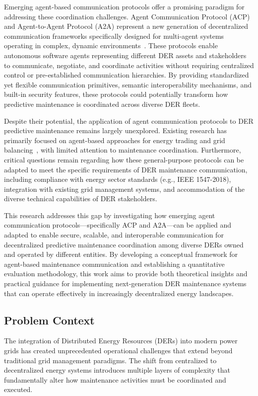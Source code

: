 \documentclass[12pt,a4paper]{article}
\begin{document}
Emerging agent-based communication protocols offer a promising paradigm for addressing these coordination challenges. Agent Communication Protocol (ACP) and Agent-to-Agent Protocol (A2A) represent a new generation of decentralized communication frameworks specifically designed for multi-agent systems operating in complex, dynamic environments~\cite{smith2023}. These protocols enable autonomous software agents representing different DER assets and stakeholders to communicate, negotiate, and coordinate activities without requiring centralized control or pre-established communication hierarchies. By providing standardized yet flexible communication primitives, semantic interoperability mechanisms, and built-in security features, these protocols could potentially transform how predictive maintenance is coordinated across diverse DER fleets.

Despite their potential, the application of agent communication protocols to DER predictive maintenance remains largely unexplored. Existing research has primarily focused on agent-based approaches for energy trading and grid balancing~\cite{ringler2016,khorasany2020}, with limited attention to maintenance coordination. Furthermore, critical questions remain regarding how these general-purpose protocols can be adapted to meet the specific requirements of DER maintenance communication, including compliance with energy sector standards (e.g., IEEE 1547-2018), integration with existing grid management systems, and accommodation of the diverse technical capabilities of DER stakeholders.

This research addresses this gap by investigating how emerging agent communication protocols---specifically ACP and A2A---can be applied and adapted to enable secure, scalable, and interoperable communication for decentralized predictive maintenance coordination among diverse DERs owned and operated by different entities. By developing a conceptual framework for agent-based maintenance communication and establishing a quantitative evaluation methodology, this work aims to provide both theoretical insights and practical guidance for implementing next-generation DER maintenance systems that can operate effectively in increasingly decentralized energy landscapes.

\subsection{Problem Context}

The integration of Distributed Energy Resources (DERs) into modern power grids has created unprecedented operational challenges that extend beyond traditional grid management paradigms. The shift from centralized to decentralized energy systems introduces multiple layers of complexity that fundamentally alter how maintenance activities must be coordinated and executed.
\end{document}
